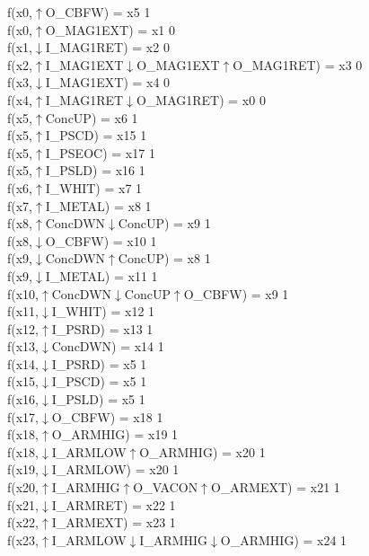 f(x0,$\uparrow$O\_CBFW) = x5 {1} \\
f(x0,$\uparrow$O\_MAG1EXT) = x1 {0} \\
f(x1,$\downarrow$I\_MAG1RET) = x2 {0} \\
f(x2,$\uparrow$I\_MAG1EXT$\downarrow$O\_MAG1EXT$\uparrow$O\_MAG1RET) = x3 {0} \\
f(x3,$\downarrow$I\_MAG1EXT) = x4 {0} \\
f(x4,$\uparrow$I\_MAG1RET$\downarrow$O\_MAG1RET) = x0 {0} \\
f(x5,$\uparrow$ConcUP) = x6 {1} \\
f(x5,$\uparrow$I\_PSCD) = x15 {1} \\
f(x5,$\uparrow$I\_PSEOC) = x17 {1} \\
f(x5,$\uparrow$I\_PSLD) = x16 {1} \\
f(x6,$\uparrow$I\_WHIT) = x7 {1} \\
f(x7,$\uparrow$I\_METAL) = x8 {1} \\
f(x8,$\uparrow$ConcDWN$\downarrow$ConcUP) = x9 {1} \\
f(x8,$\downarrow$O\_CBFW) = x10 {1} \\
f(x9,$\downarrow$ConcDWN$\uparrow$ConcUP) = x8 {1} \\
f(x9,$\downarrow$I\_METAL) = x11 {1} \\
f(x10,$\uparrow$ConcDWN$\downarrow$ConcUP$\uparrow$O\_CBFW) = x9 {1} \\
f(x11,$\downarrow$I\_WHIT) = x12 {1} \\
f(x12,$\uparrow$I\_PSRD) = x13 {1} \\
f(x13,$\downarrow$ConcDWN) = x14 {1} \\
f(x14,$\downarrow$I\_PSRD) = x5 {1} \\
f(x15,$\downarrow$I\_PSCD) = x5 {1} \\
f(x16,$\downarrow$I\_PSLD) = x5 {1} \\
f(x17,$\downarrow$O\_CBFW) = x18 {1} \\
f(x18,$\uparrow$O\_ARMHIG) = x19 {1} \\
f(x18,$\downarrow$I\_ARMLOW$\uparrow$O\_ARMHIG) = x20 {1} \\
f(x19,$\downarrow$I\_ARMLOW) = x20 {1} \\
f(x20,$\uparrow$I\_ARMHIG$\uparrow$O\_VACON$\uparrow$O\_ARMEXT) = x21 {1} \\
f(x21,$\downarrow$I\_ARMRET) = x22 {1} \\
f(x22,$\uparrow$I\_ARMEXT) = x23 {1} \\
f(x23,$\uparrow$I\_ARMLOW$\downarrow$I\_ARMHIG$\downarrow$O\_ARMHIG) = x24 {1} \\
